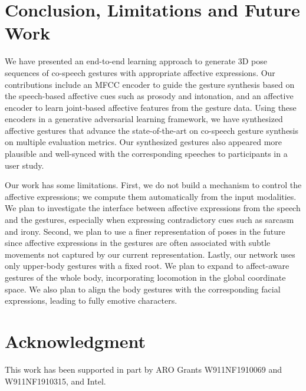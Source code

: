 \documentclass[conference,compsoc]{IEEEtran}
\theoremstyle{definition}
\begin{document}
\section{Conclusion, Limitations and Future Work}
We have presented an end-to-end learning approach to generate 3D pose sequences of co-speech gestures with appropriate affective expressions. Our contributions include an MFCC encoder to guide the gesture synthesis based on the speech-based affective cues such as prosody and intonation, and an affective encoder to learn joint-based affective features from the gesture data. Using these encoders in a generative adversarial learning framework, we have synthesized affective gestures that advance the state-of-the-art on co-speech gesture synthesis on multiple evaluation metrics. Our synthesized gestures also appeared more plausible and well-synced with the corresponding speeches to participants in a user study.

Our work has some limitations. First, we do not build a mechanism to control the affective expressions; we compute them automatically from the input modalities. We plan to investigate the interface between affective expressions from the speech and the gestures, especially when expressing contradictory cues such as sarcasm and irony. Second, we plan to use a finer representation of poses in the future since affective expressions in the gestures are often associated with subtle movements not captured by our current representation. Lastly, our network uses only upper-body gestures with a fixed root. We plan to expand to affect-aware gestures of the whole body, incorporating locomotion in the global coordinate space. We also plan to align the body gestures with the corresponding facial expressions, leading to fully emotive characters.





\section*{Acknowledgment}
This work has been supported in part by ARO Grants W911NF1910069 and W911NF1910315, and Intel.










\end{document}
